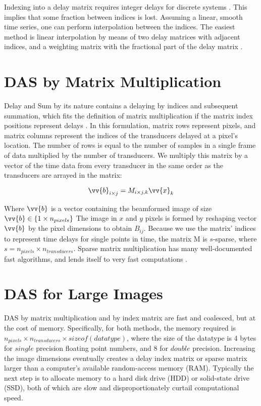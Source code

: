     Indexing into a delay matrix requires integer delays for discrete systems \cite{burger2013principles}. This implies that some fraction between indices is lost. Assuming a linear, smooth time series, one can perform interpolation between the indices. The easiest method is linear interpolation by means of two delay matrices with adjacent indices, and a weighting matrix with the fractional part of the delay matrix \cite{perrotYouThinkYou2021a}.

\section{DAS by Matrix Multiplication}
\label{chapter2:mmult_das}

    Delay and Sum by its nature contains a delaying by indices and subsequent summation, which fits the definition of matrix multiplication if the matrix index positions represent delays \cite{6841027}. In this formulation, matrix rows represent pixels, and matrix columns represent the indices of the transducers delayed at a pixel's location. The number of rows is equal to the number of samples in a single frame of data multiplied by the number of transducers. We multiply this matrix by a vector of the time data from every transducer in the same order as the transducers are arrayed in the matrix:

    \begin{equation}
        \vv{b}_{i \times j} = M_{i\times j, k}\vv{x}_{k}
    \end{equation}

    Where $\vv{b}$ is a vector containing the beamformed image of size $\vv{b} \in \{1 \times n_{pixels}\}$ The image in $x$ and $y$ pixels is formed by reshaping vector $\vv{b}$ by the pixel dimensions to obtain $B_{ij}$. Because we use the matrix' indices to represent time delays for single points in time, the matrix M is $s$-sparse, where $s = n_{pixels}\times n_{transducers}$. Sparse matrix multiplication has many well-documented fast algorithms, and lends itself to very fast computations \cite{gilbertSparseMatricesMATLAB1992}.

\section{DAS for Large Images}
\label{chapter2:large_images}

    DAS by matrix multiplication and by index matrix are fast and coalesced, but at the cost of memory. Specifically, for both methods, the memory required is $n_{pixels}\times n_{transducers} \times sizeof(datatype)$, where the size of the datatype is 4 bytes for $single$ precision floating point numbers, and 8 for $double$ precision. Increasing the image dimensions eventually creates a delay index matrix or sparse matrix larger than a computer's available random-access memory (RAM). Typically the next step is to allocate memory to a hard disk drive (HDD) or solid-state drive (SSD), both of which are slow and disproportionately curtail computational speed.

